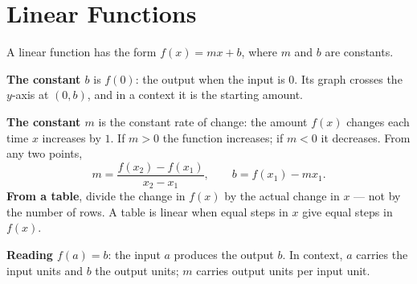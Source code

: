 \chapter{Linear Functions}

\begin{essentials}
A linear function has the form $f(x)=mx+b$, where $m$ and $b$ are constants.

\textbf{The constant $b$} is $f(0)$: the output when the input is $0$. Its
graph crosses the $y$-axis at $(0,b)$, and in a context it is the starting
amount.

\textbf{The constant $m$} is the constant rate of change: the amount $f(x)$
changes each time $x$ increases by $1$. If $m>0$ the function increases; if
$m<0$ it decreases. From any two points,
\[ m=\dfrac{f(x_2)-f(x_1)}{x_2-x_1},\qquad b=f(x_1)-mx_1. \]
\textbf{From a table}, divide the change in $f(x)$ by the actual change in
$x$ --- not by the number of rows. A table is linear when equal steps in $x$
give equal steps in $f(x)$.

\textbf{Reading $f(a)=b$}: the input $a$ produces the output $b$. In context,
$a$ carries the input units and $b$ the output units; $m$ carries output
units per input unit.
\end{essentials}

